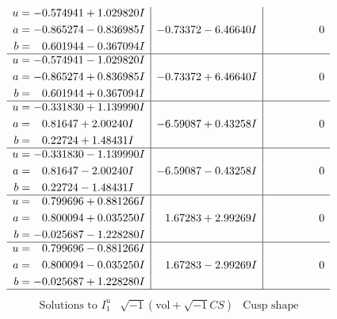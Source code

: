 \documentclass[1p]{elsarticle_modified}
\theoremstyle{definition}
\newcommand{\I}{\sqrt{-1}}
\begin{document}
$$\begin{array}{c|c|c}
\begin{aligned}
u &= -0.574941 + 1.029820 I \\
a &= -0.865274 - 0.836985 I \\
b &= \phantom{-}0.601944 - 0.367094 I\end{aligned}
 & -0.73372 - 6.46640 I & \phantom{-0.000000 } 0 \\ \hline\begin{aligned}
u &= -0.574941 - 1.029820 I \\
a &= -0.865274 + 0.836985 I \\
b &= \phantom{-}0.601944 + 0.367094 I\end{aligned}
 & -0.73372 + 6.46640 I & \phantom{-0.000000 } 0 \\ \hline\begin{aligned}
u &= -0.331830 + 1.139990 I \\
a &= \phantom{-}0.81647 + 2.00240 I \\
b &= \phantom{-}0.22724 + 1.48431 I\end{aligned}
 & -6.59087 + 0.43258 I & \phantom{-0.000000 } 0 \\ \hline\begin{aligned}
u &= -0.331830 - 1.139990 I \\
a &= \phantom{-}0.81647 - 2.00240 I \\
b &= \phantom{-}0.22724 - 1.48431 I\end{aligned}
 & -6.59087 - 0.43258 I & \phantom{-0.000000 } 0 \\ \hline\begin{aligned}
u &= \phantom{-}0.799696 + 0.881266 I \\
a &= \phantom{-}0.800094 + 0.035250 I \\
b &= -0.025687 - 1.228280 I\end{aligned}
 & \phantom{-}1.67283 + 2.99269 I & \phantom{-0.000000 } 0 \\ \hline\begin{aligned}
u &= \phantom{-}0.799696 - 0.881266 I \\
a &= \phantom{-}0.800094 - 0.035250 I \\
b &= -0.025687 + 1.228280 I\end{aligned}
 & \phantom{-}1.67283 - 2.99269 I & \phantom{-0.000000 } 0\\
 \hline 
 \end{array}$$\newpage$$\begin{array}{c|c|c}  
\text{Solutions to }I^u_{1}& \I (\text{vol} + \sqrt{-1}CS) & \text{Cusp shape}\\
 \hline 
\begin{aligned}

\end{aligned}
\end{array}$$
\end{document}
